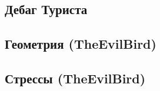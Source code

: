 \documentclass[a4paper]{article}
\begin{document}
\begin{multicols*}{2}
        \subsection{Дебаг Туриста}
            
        
        \subsection{Геометрия (TheEvilBird)}
            

        \subsection{Стрессы (TheEvilBird)}
            
    
\end{multicols*}

% 
\end{document}
